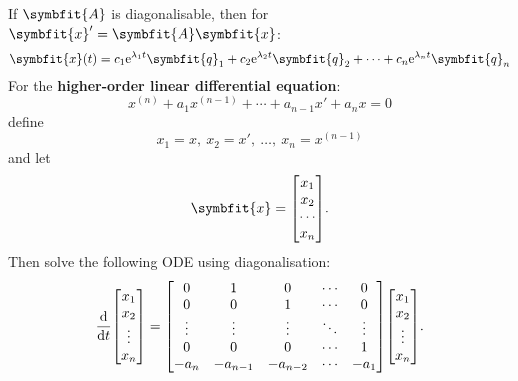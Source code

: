 \documentclass{article}
\begin{document}
\begin{multicols*}{2}
    If $\symbfit{A}$ is diagonalisable, then for $\symbfit{x}' = \symbfit{A} \symbfit{x}$:
    \begin{equation*}
        \symbfit{x}(t) = c_1 \e^{\lambda_1 t} \symbfit{q}_1 + c_2 \e^{\lambda_2 t} \symbfit{q}_2 + \cdots + c_n \e^{\lambda_n t} \symbfit{q}_n
    \end{equation*}
    For the \textbf{higher-order linear differential equation}:
    \begin{equation*}
        x^{\left( n \right)} + a_1 x^{\left( n-1 \right)} + \cdots + a_{n-1} x' + a_n x = 0
    \end{equation*}
    define
    \begin{equation*}
        x_1 = x,\: x_2 = x',\: \dots,\: x_n = x^{\left( n-1 \right)}
    \end{equation*}
    and let
    \begin{equation*}
        \symbfit{x}=\mqty[x_1 \\ x_2 \\ \cdots \\ x_n].
    \end{equation*}
    Then solve the following ODE using diagonalisation:
    \begin{equation*}
        \dv{t}\mqty[
            x_1 \\
            x_2 \\
            \vdotswithin{x_3} \\
            x_n
        ] = \mqty[
        0 & 1 & 0 & \cdots & 0 \\
        0 & 0 & 1 & \cdots & 0 \\
        \vdots & \vdots & \vdots & \ddots & \vdots \\
        0 & 0 & 0 & \cdots & 1 \\
        -a_n & -a_{n-1} & -a_{n-2} & \cdots & -a_1
        ] \mqty[
            x_1 \\
            x_2 \\
            \vdotswithin{x_3} \\
            x_n
        ].
    \end{equation*}

\end{multicols*}
\end{document}
